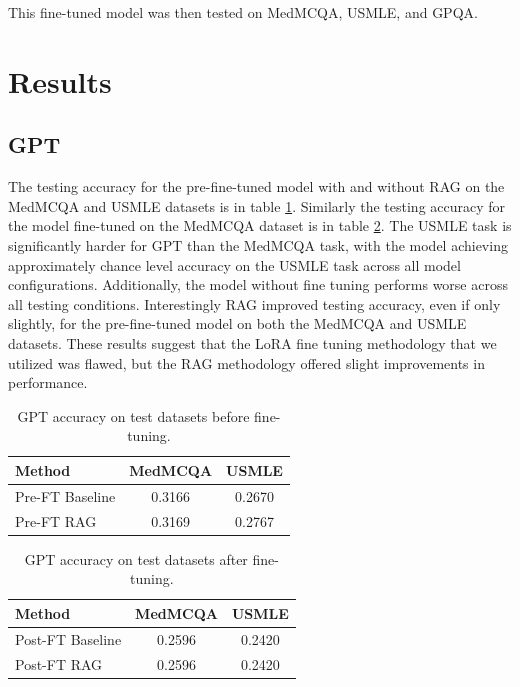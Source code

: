 \documentclass{article}
\begin{document}
This fine-tuned model was then tested on MedMCQA, USMLE, and GPQA.

\section{Results}

\subsection{GPT}
The testing accuracy for the pre-fine-tuned model with and without RAG on the MedMCQA and USMLE datasets is in table \ref{tab:GPTmedmcqa_preft}. Similarly the testing accuracy for the model fine-tuned on the MedMCQA dataset is in table \ref{tab:GPTmedmcqa_postft}. The USMLE task is significantly harder for GPT than the MedMCQA task, with the model achieving approximately chance level accuracy on the USMLE task across all model configurations. Additionally, the model without fine tuning performs worse across all testing conditions. Interestingly RAG improved testing accuracy, even if only slightly, for the pre-fine-tuned model on both the MedMCQA and USMLE datasets. These results suggest that the LoRA fine tuning methodology that we utilized was flawed, but the RAG methodology offered slight improvements in performance.

\begin{table}[h]
    \centering
    \begin{tabular}{lcc}
        \hline
        \textbf{Method} & \textbf{MedMCQA} & \textbf{USMLE} \\
        \hline
        Pre-FT Baseline & 0.3166            & 0.2670          \\
        Pre-FT RAG      & 0.3169            & 0.2767          \\
        \hline
    \end{tabular}
    \caption{GPT accuracy on test datasets before fine-tuning.}
    \label{tab:GPTmedmcqa_preft}
\end{table}

\begin{table}[h]
    \centering
    \begin{tabular}{lcc}
        \hline
        \textbf{Method}  & \textbf{MedMCQA} & \textbf{USMLE} \\
        \hline
        Post-FT Baseline & 0.2596           & 0.2420          \\
        Post-FT RAG      & 0.2596            & 0.2420          \\
        \hline
    \end{tabular}
    \caption{GPT accuracy on test datasets after fine-tuning.}
    \label{tab:GPTmedmcqa_postft}
\end{table}
\end{document}
